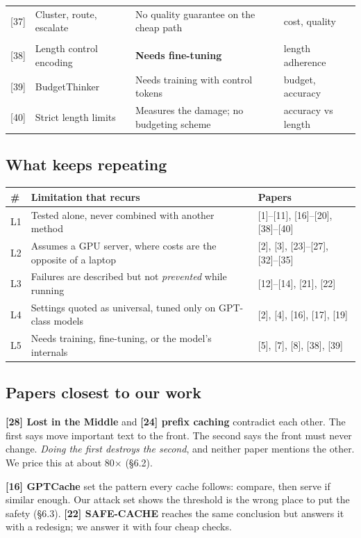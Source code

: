 \documentclass[11pt,a4paper]{article}
\begin{document}
\begin{tabularx}{\textwidth}{@{}l L{3.6cm} X l@{}}
{[37]} & Cluster, route, escalate & No quality guarantee on the cheap path & cost, quality \\
\addlinespace
{}\\
{[38]} & Length control encoding & \textbf{Needs fine-tuning} & length adherence \\
{[39]} & BudgetThinker & Needs training with control tokens & budget, accuracy \\
{[40]} & Strict length limits & Measures the damage; no budgeting scheme & accuracy vs length \\
\bottomrule
\end{tabularx}

\subsection{What keeps repeating}

\begin{tabularx}{\textwidth}{@{}l X l@{}}
\toprule
\textbf{\#} & \textbf{Limitation that recurs} & \textbf{Papers} \\
\midrule
L1 & Tested alone, never combined with another method & [1]--[11], [16]--[20], [38]--[40] \\
L2 & Assumes a GPU server, where costs are the opposite of a laptop & [2], [3], [23]--[27], [32]--[35] \\
L3 & Failures are described but not \emph{prevented} while running & [12]--[14], [21], [22] \\
L4 & Settings quoted as universal, tuned only on GPT-class models & [2], [4], [16], [17], [19] \\
L5 & Needs training, fine-tuning, or the model's internals & [5], [7], [8], [38], [39] \\
\bottomrule
\end{tabularx}

\subsection{Papers closest to our work}

\textbf{[28] Lost in the Middle} and \textbf{[24] prefix caching} contradict each
other. The first says move important text to the front. The second says the front
must never change. \emph{Doing the first destroys the second}, and neither paper
mentions the other. We price this at about 80$\times$ (\S6.2).

\textbf{[16] GPTCache} set the pattern every cache follows: compare, then serve if
similar enough. Our attack set shows the threshold is the wrong place to put the
safety (\S6.3). \textbf{[22] SAFE-CACHE} reaches the same conclusion but answers it
with a redesign; we answer it with four cheap checks.
\end{document}

